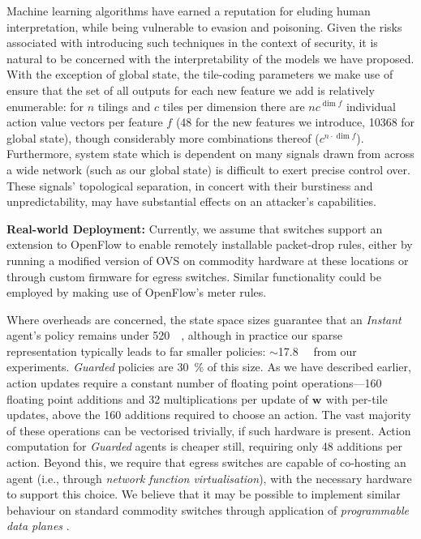 \documentclass[10pt, times, conference, letterpaper]{IEEEtran}
\newcommand{\wvec}[1]{\ensuremath{\bm{w}_{#1}}}
\newcommand{\fakepara}[1]{\noindent\textbf{#1:}}
\begin{document}
Machine learning algorithms have earned a reputation for eluding human interpretation, while being vulnerable to evasion and poisoning.
Given the risks associated with introducing such techniques in the context of security, it is natural to be concerned with the interpretability of the models we have proposed.
With the exception of global state, the tile-coding parameters we make use of ensure that the set of all outputs for each new feature we add is relatively enumerable: for $n$ tilings and $c$ tiles per dimension there are $nc^{\dim{f}}$ individual action value vectors per feature $f$ (\num{48} for the new features we introduce, \num{10368} for global state), though considerably more combinations thereof ($c^{n \cdot \dim{f}}$).
Furthermore, system state which is dependent on many signals drawn from across a wide network (such as our global state) is difficult to exert precise control over.
These signals' topological separation, in concert with their burstiness and unpredictability, may have substantial effects on an attacker's capabilities.

\fakepara{Real-world Deployment}
Currently, we assume that switches support an extension to OpenFlow to enable remotely installable packet-drop rules, either by running a modified version of OVS on commodity hardware at these locations or through custom firmware for egress switches.
Similar functionality could be employed by making use of OpenFlow's meter rules.

Where overheads are concerned, the state space sizes guarantee that an \emph{Instant} agent's policy remains under \SI{520}{\kibi\byte}, although in practice our sparse representation typically leads to far smaller policies: $\sim$\SI{17.8}{\kibi\byte} from our experiments.
\emph{Guarded} policies are \SI{30}{\percent} of this size.
As we have described earlier, action updates require a constant number of floating point operations---\num{160} floating point additions and \num{32} multiplications per update of $\wvec{}$ with per-tile updates, above the \num{160} additions required to choose an action.
The vast majority of these operations can be vectorised trivially, if such hardware is present.
Action computation for \emph{Guarded} agents is cheaper still, requiring only \num{48} additions per action.
Beyond this, we require that egress switches are capable of co-hosting an agent (i.e., through \emph{network function virtualisation}), with the necessary hardware to support this choice.
We believe that it may be possible to implement similar behaviour on standard commodity switches through application of \emph{programmable data planes} \cite{DBLP:conf/ancs/JouetP17}.
\end{document}
